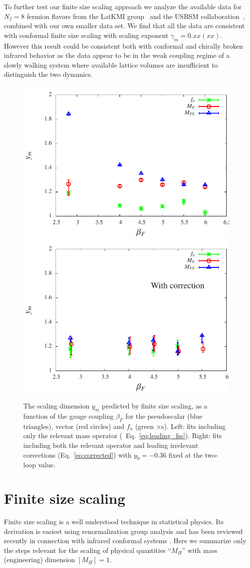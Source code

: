 \documentclass[aps,prl,twocolumn,]{revtex4}  %
\newcommand{\eq}[1]{Eq.~\ref{#1}}
\begin{document}
To further test our finite size scaling approach we analyze the available data for $N_f=8$ fermion flavors  from the LatKMI group~\cite{Aoki:2013xza} and  the USBSM collaboration~\cite{Schaich:2013eba}, combined with our own smaller data set. We find that all the data are consistent with  conformal finite size scaling  with scaling exponent $\gamma_m=0.xx(xx)$. However this result could be consistent both with conformal and  chirally broken  infrared behavior as the data appear to be in the  weak coupling regime of a slowly walking system where available lattice volumes are insufficient to distinguish the two  dynamics.




\begin{figure}[tb]
\centering
  \includegraphics[width=0.45\linewidth]{ym_c0} \hfill
  \includegraphics[width=0.45\linewidth]{ym}
   \caption{\label{fig:scaling_exp} The scaling dimension $y_m$ predicted by finite size scaling, as a function of the gauge coupling $\beta_F$ for the pseudoscalar (blue triangles), vector (red circles) and $f_\pi$ (green $\times$s).  Left: fits including only the relevant mass operator (~\protect\eq{eq:leading_fss}).  Right: fits including both the relevant operator and leading irrelevant corrections (\protect\eq{eq:corrected}) with $y_0=-0.36$ fixed at the two-loop value.}
 \end{figure}


\section{Finite size scaling}
Finite size scaling is a well understood technique in statistical physics.
Its derivation is easiest using renormalization group analysis and has been reviewed recently in connection with infrared conformal systems \cite{DeGrand:2009mt, DelDebbio:2010ze,DelDebbio:2013qta}.
Here we summarize only the steps relevant for the scaling of physical quantities ``$M_H$'' with mass (engineering) dimension $[M_H] = 1$.
\end{document}
